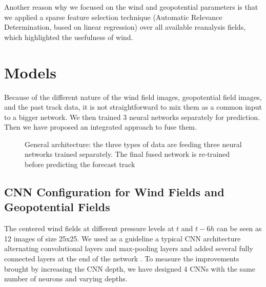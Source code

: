  Another reason why we focused on the wind and geopotential parameters is that we applied a sparse feature selection technique (Automatic Relevance Determination, based on linear regression) over all available reanalysis fields, which highlighted the usefulness of wind.

\section{Models}
Because of the different nature of the wind field images, geopotential field images, and the past track data, it is not straightforward to mix them as a common input to a bigger network. We then trained 3 neural networks separately for prediction. Then we have proposed an integrated approach to fuse them. 

\begin{figure}
	\begin{center}
		\hsize {}
	\end{center}
	\caption{General architecture: the three types of data are feeding three neural networks trained separately. The final fused network is re-trained before predicting the forecast track}
	\label{fig:storm_tracks}
\end{figure}

\subsection{CNN Configuration for Wind Fields and Geopotential Fields}
 The centered wind fields at different pressure levels at $t$ and $t-6h$ can be seen as 12 images of size 25x25. We used as a guideline a typical CNN architecture alternating convolutional layers and max-pooling layers and added several fully connected layers at the end of the network \cite{simonyan2014very}. To measure the improvements brought by increasing the CNN depth, we have designed 4 CNNs with the same number of neurons and varying depths. 


